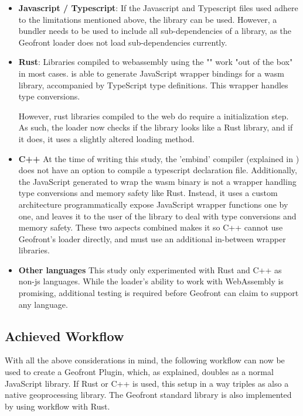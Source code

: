 \begin{itemize}[-]
  \item \textbf{Javascript / Typescript}: 
    If the Javascript and Typescript files used adhere to the limitations mentioned above, the library can be used. 
    However, a bundler needs to be used to include all sub-dependencies of a library, as the Geofront loader does not load sub-dependencies currently. 

  \item \textbf{Rust}:
    Libraries compiled to webassembly using the "" work "out of the box" in most cases.
     is able to generate JavaScript wrapper bindings for a \ac{wasm} library, accompanied by TypeScript type definitions. 
    This wrapper handles type conversions. 
    
    However, rust libraries compiled to the web do require a initialization step. 
    As such, the loader now checks if the library looks like a Rust library, and if it does, it uses a slightly altered loading method.
  \item \textbf{C++}
    At the time of writing this study, the 'embind' compiler (explained in ) does not have an option to compile a typescript declaration file. 
    Additionally, the JavaScript generated to wrap the wasm binary is not a wrapper handling type conversions and memory safety like Rust. 
    Instead, it uses a custom architecture programmatically expose JavaScript wrapper functions one by one, and leaves it to the user of the library to deal with type conversions and memory safety. 
    These two aspects combined makes it so C++ cannot use Geofront's loader directly, and must use an additional in-between wrapper libraries.

  \item \textbf{Other languages}
    This study only experimented with Rust and C++ as non-js languages.
    While the loader's ability to work with WebAssembly is promising, additional testing is required before Geofront can claim to support any language. 
\end{itemize}

\subsection{Achieved Workflow}
\label{sec:implementation:workflow}


With all the above considerations in mind, the following workflow can now be used to create a Geofront Plugin, which, as explained, doubles as a normal JavaScript library. 
If Rust or C++ is used, this setup in a way triples as also a native geoprocessing library.
The Geofront standard library is also implemented by using workflow with Rust.

